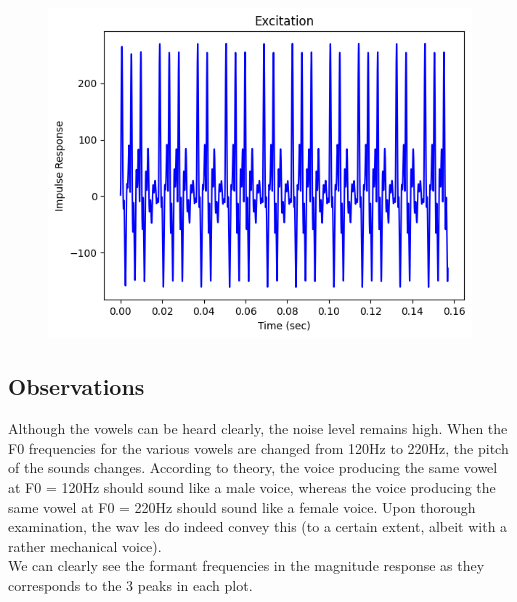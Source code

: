 \documentclass{article}
\begin{document}
\begin{figure}[H]
\begin{center}
\includegraphics[scale = 0.5]{Q4_C2R.png}
\end{center}
\end{figure}

\subsection{Observations}
Although the vowels can be heard clearly, the noise level remains high. When the F0 frequencies for the various vowels are changed from 120Hz to 220Hz, the pitch of the sounds changes. According to theory, the voice producing the same vowel at F0 = 120Hz should sound like a male voice, whereas the voice producing the same vowel at F0 = 220Hz should sound like a female voice. Upon thorough examination, the wav les do indeed convey this (to a certain extent, albeit with a rather mechanical voice).\\

We can clearly see the formant frequencies in the magnitude response as they corresponds to the 3 peaks in each plot.
    
\end{document}

